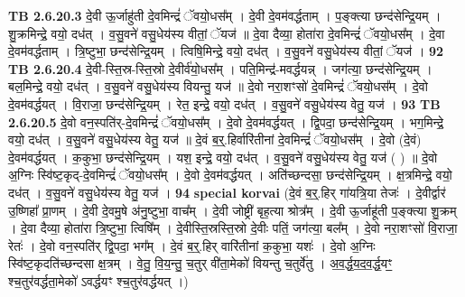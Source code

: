 \documentclass[17pt]{extarticle}
\begin{document}
                  \newline
                                \textbf{ TB 2.6.20.3} \newline
                  दे॒वी ऊ॒र्जाहु॑ती दे॒वमिन्द्रं॑ ॅवयो॒धस᳚म् । दे॒वी दे॒वम॑वर्द्धताम् । प॒ङ्क्त्या छन्द॑सेन्द्रि॒यम् । शु॒क्रमिन्द्रे॒ वयो॒ दध॑त् । व॒सु॒वने॑ वसु॒धेय॑स्य वीतां॒ ॅयज॑ ॥ दे॒वा दैव्या॒ होता॑रा दे॒वमिन्द्रं॑ ॅवयो॒धस᳚म् । दे॒वा दे॒वम॑वर्द्धताम् । त्रि॒ष्टुभा॒ छन्द॑सेन्द्रि॒यम् । त्विषि॒मिन्द्रे॒ वयो॒ दध॑त् । व॒सु॒वने॑ वसु॒धेय॑स्य वीतां॒ ॅयज॑ । \textbf{ 92} \newline
                  \newline
                                \textbf{ TB 2.6.20.4} \newline
                  दे॒वी-स्ति॒स्र-स्ति॒स्रो दे॒वीर्व॑यो॒धस᳚म् । पति॒मिन्द्र॑-मवर्द्धयन्न् । जग॑त्या॒ छन्द॑सेन्द्रि॒यम् । बल॒मिन्द्रे॒ वयो॒ दध॑त् । व॒सु॒वने॑ वसु॒धेय॑स्य वियन्तु॒ यज॑ ॥ दे॒वो नरा॒शꣳसो॑ दे॒वमिन्द्रं॑ ॅवयो॒धस᳚म् । दे॒वो दे॒वम॑वर्द्धयत् । वि॒राजा॒ छन्द॑सेन्द्रि॒यम् । रेत॒ इन्द्रे॒ वयो॒ दध॑त् । व॒सु॒वने॑ वसु॒धेय॑स्य वेतु॒ यज॑ । \textbf{ 93} \newline
                  \newline
                                \textbf{ TB 2.6.20.5} \newline
                  दे॒वो वन॒स्पति॑र्-दे॒वमिन्द्रं॑ ॅवयो॒धस᳚म् । दे॒वो दे॒वम॑वर्द्धयत् । द्वि॒पदा॒ छन्द॑सेन्द्रि॒यम् । भग॒मिन्द्रे॒ वयो॒ दध॑त् । व॒सु॒वने॑ वसु॒धेय॑स्य वेतु॒ यज॑ ॥ दे॒वं ब॒र्॒.हिर्वारि॑तीनां दे॒वमिन्द्रं॑ ॅवयो॒धस᳚म् । दे॒वो (दे॒वं) दे॒वम॑वर्द्धयत् । क॒कुभा॒ छन्द॑सेन्द्रि॒यम् । यश॒ इन्द्रे॒ वयो॒ दध॑त् । व॒सु॒वने॑ वसु॒धेय॑स्य वेतु॒ यज॑ ( ) ॥ दे॒वो अ॒ग्निः स्वि॑ष्ट॒कृद्-दे॒वमिन्द्रं॑ ॅवयो॒धस᳚म् । दे॒वो दे॒वम॑वर्द्धयत् । अति॑च्छन्दसा॒ छन्द॑सेन्द्रि॒यम् । क्ष॒त्रमिन्द्रे॒ वयो॒ दध॑त् । व॒सु॒वने॑ वसु॒धेय॑स्य वेतु॒ यज॑ । \textbf{ 94} \newline
                  \newline
                                                        \textbf{special korvai} \newline
              (दे॒वं ब॒र्॒.हिर् गा॑यत्रि॒या तेजः॑ । दे॒वीर्द्वार॑ उ॒ष्णिहा᳚ प्रा॒णम् । दे॒वी दे॒वमु॒षे अ॑नु॒ष्टुभा॒ वाच᳚म् । दे॒वी जोष्ट्री॑ बृह॒त्या श्रोत्र᳚म् । दे॒वी ऊ॒र्जाहू॑ती प॒ङ्क्त्या शु॒क्रम् । दे॒वा दैव्या॒ होता॑रा त्रि॒ष्टुभा॒ त्विषि᳚म् । दे॒वीस्ति॒स्रस्ति॒स्रो दे॒वीः पतिं॒ जग॑त्या॒ बल᳚म् । दे॒वो नरा॒शꣳसो॑ वि॒राजा॒ रेतः॑ । दे॒वो वन॒स्पति॑र् द्वि॒पदा॒ भग᳚म् । दे॒वं ब॒र्॒.हिर् वारि॑तीनां क॒कुभा॒ यशः॑ । दे॒वो अ॒ग्निः स्वि॑ष्ट॒कृदति॑च्छन्दसा क्ष॒त्रम् । वे॒तु॒ वि॒य॒न्तु॒ च॒तुर् वी॑ता॒मेको॑ वियन्तु च॒तुर्वे॑तु । अ॒व॒र्द्ध॒य॒द॒व॒र्द्ध॒यꣳ॒॒ श्च॒तुर॑वर्द्धता॒मेको॑ ऽवर्द्धयꣳ श्च॒तुर॑वर्द्धयत् ।) \newline
\end{document}
